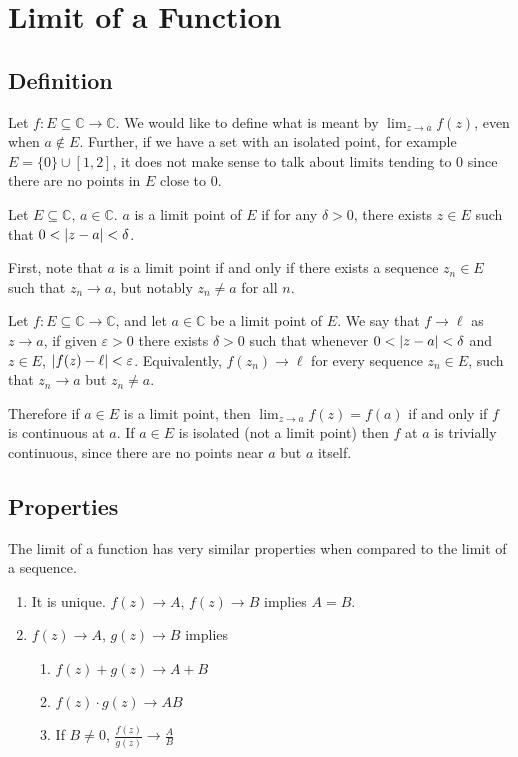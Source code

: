 \documentclass{article}
\begin{document}
\section{Limit of a Function}
\subsection{Definition}
Let $f \colon E \subseteq \mathbb C \to \mathbb C$. We would like to define what is meant by $\lim_{z \to a} f(z)$, even when $a \notin E$. Further, if we have a set with an isolated point, for example $E = \{ 0 \} \cup [1, 2]$, it does not make sense to talk about limits tending to 0 since there are no points in $E$ close to 0.
\begin{definition}
	Let $E \subseteq \mathbb C,\, a \in \mathbb C$. $a$ is a limit point of $E$ if for any $\delta > 0$, there exists $z \in E$ such that $0 < \abs{z - a} < \delta$.
\end{definition}
\noindent First, note that $a$ is a limit point if and only if there exists a sequence $z_n \in E$ such that $z_n \to a$, but notably $z_n \neq a$ for all $n$.
\begin{definition}
	Let $f \colon E \subseteq \mathbb C \to \mathbb C$, and let $a \in \mathbb C$ be a limit point of $E$. We say that $f \to \ell$ as $z \to a$, if given $\varepsilon > 0$ there exists $\delta > 0$ such that whenever $0 < \abs{z - a} < \delta$ and $z \in E$, $\abs{f(z) - \ell} < \varepsilon$. Equivalently, $f(z_n) \to \ell$ for every sequence $z_n \in E$, such that $z_n \to a$ but $z_n \neq a$.
\end{definition}
\noindent Therefore if $a \in E$ is a limit point, then $\lim_{z \to a} f(z) = f(a)$ if and only if $f$ is continuous at $a$. If $a \in E$ is isolated (not a limit point) then $f$ at $a$ is trivially continuous, since there are no points near $a$ but $a$ itself.

\subsection{Properties}
The limit of a function has very similar properties when compared to the limit of a sequence.
\begin{enumerate}
	\item It is unique. $f(z) \to A$, $f(z) \to B$ implies $A = B$.
	\item $f(z) \to A$, $g(z) \to B$ implies
	      \begin{enumerate}
		      \item $f(z) + g(z) \to A + B$
		      \item $f(z)\cdot g(z) \to AB$
		      \item If $B \neq 0$, $\frac{f(z)}{g(z)} \to \frac{A}{B}$
	      \end{enumerate}
\end{enumerate}
\end{document}
